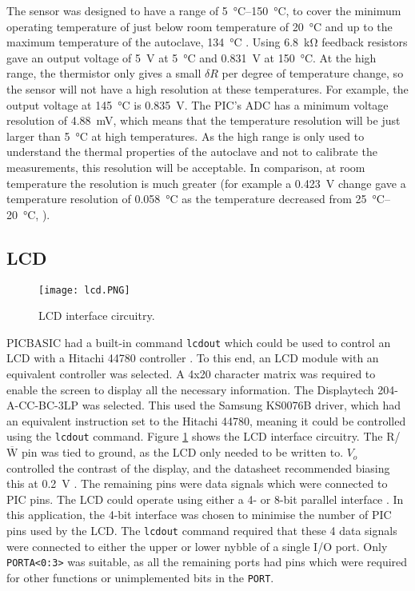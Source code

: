 The sensor was designed to have a range of \SIrange{5}{150}{\celsius}, to cover the minimum operating temperature of just below room temperature of \SI{20}{\celsius} and up to the maximum temperature of the autoclave, \SI{134}{\celsius} \cite{nhs_autoclave}. Using \SI{6.8}{\kilo\ohm} feedback resistors gave an output voltage of \SI{5}{\volt} at \SI{5}{\celsius} and \SI{0.831}{\volt} at \SI{150}{\celsius}. At the high range, the thermistor only gives a small $\delta R$ per degree of temperature change, so the sensor will not have a high resolution at these temperatures. For example, the output voltage at \SI{145}{\celsius} is \SI{0.835}{\volt}. The PIC's ADC has a minimum voltage resolution of \SI{4.88}{\milli\volt}, which means that the temperature resolution will be just larger than \SI{5}{\celsius} at high temperatures. As the high range is only used to understand the thermal properties of the autoclave and not to calibrate the measurements, this resolution will be acceptable. In comparison, at room temperature the resolution is much greater (for example a \SI{0.423}{\volt} change gave a temperature resolution of \SI{0.058}{\celsius} as the temperature decreased from \SIrange{25}{20}{\celsius}, ).





\subsection{LCD}
\begin{figure}[htb]
	\centering
	\texttt{[image: lcd.PNG]}
	\caption{LCD interface circuitry.}
	\label{fig: lcd schematic}
\end{figure}

PICBASIC had a built-in command \verb|lcdout| which could be used to control an LCD with a Hitachi 44780 controller \cite{picbasic_pro}. To this end, an LCD module with an equivalent controller was selected. A 4x20 character matrix was required to enable the screen to display all the necessary information. The Displaytech 204-A-CC-BC-3LP \cite{lcd} was selected. This used the Samsung KS0076B driver, which had an equivalent instruction set to the Hitachi 44780, meaning it could be controlled using the \verb|lcdout| command. Figure \ref{fig: lcd schematic} shows the LCD interface circuitry. The R/$\overline{\text{W}}$ pin was tied to ground, as the LCD only needed to be written to. $V_o$ controlled the contrast of the display, and the datasheet recommended biasing this at \SI{0.2}{\volt} \cite{lcd}. The remaining pins were data signals which were connected to PIC pins. The LCD could operate using either a 4- or 8-bit parallel interface \cite{picbasic_pro}. In this application, the 4-bit interface was chosen to minimise the number of PIC pins used by the LCD. The \verb|lcdout| command required that these 4 data signals were connected to either the upper or lower nybble of a single I/O port. Only \verb|PORTA<0:3>| was suitable, as all the remaining ports had pins which were required for other functions or unimplemented bits in the \verb|PORT|.\\

